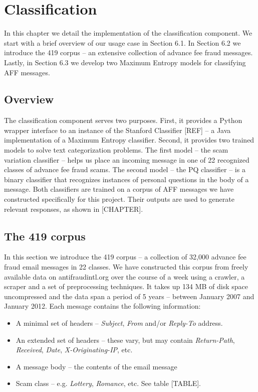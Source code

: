 \chapter{Classification}
In this chapter we detail the implementation of the classification component. We start with a brief overview of our usage case in Section 6.1. In Section 6.2 we introduce the 419 corpus -- an extensive collection of advance fee fraud messages. Lastly, in Section 6.3 we develop two Maximum Entropy models for classifying AFF messages.

\section{Overview}
The classification component serves two purposes. First, it provides a Python wrapper interface to an instance of the Stanford Classifier [REF] -- a Java implementation of a Maximum Entropy classifier. Second, it provides two trained models to solve text categorization problems. The first model -- the scam variation classifier -- helps us place an incoming message in one of 22 recognized classes of advance fee fraud scams. The second model -- the PQ classifier -- is a binary classifier that recognizes instances of personal questions in the body of a message. Both classifiers are trained on a corpus of AFF messages we have constructed specifically for this project. Their outputs are used to generate relevant responses, as shown in [CHAPTER].

\section{The 419 corpus}
In this section we introduce the 419 corpus -- a collection of 32,000 advance fee fraud email messages in 22 classes. We have constructed this corpus from freely available data on antifraudintl.org over the course of a week using a crawler, a scraper and a set of preprocessing techniques. It takes up 134 MB of disk space uncompressed and the data span a period of 5 years -- between January 2007 and January 2012.  Each message contains the following information:
\begin{itemize}
	\item A minimal set of headers -- \emph{Subject}, \emph{From} and/or \emph{Reply-To} address.
	\item An extended set of headers -- these vary, but may contain \emph{Return-Path}, \emph{Received}, \emph{Date}, \emph{X-Originating-IP}, etc.
	\item A message body -- the contents of the email message
	\item Scam class -- e.g. \emph{Lottery}, \emph{Romance}, etc. See table [TABLE].
\end{itemize}

